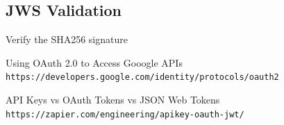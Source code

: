 \documentclass{style}
\begin{document}
\subsection{JWS Validation}
Verify the SHA256 signature

\begin{thebibliography}{9}
    Using OAuth 2.0 to Access Gooogle APIs
    \\
    \texttt{https://developers.google.com/identity/protocols/oauth2}

    API Keys vs OAuth Tokens vs JSON Web Tokens
    \\
    \texttt{https://zapier.com/engineering/apikey-oauth-jwt/}

\end{thebibliography}

\newpage
\end{document}
